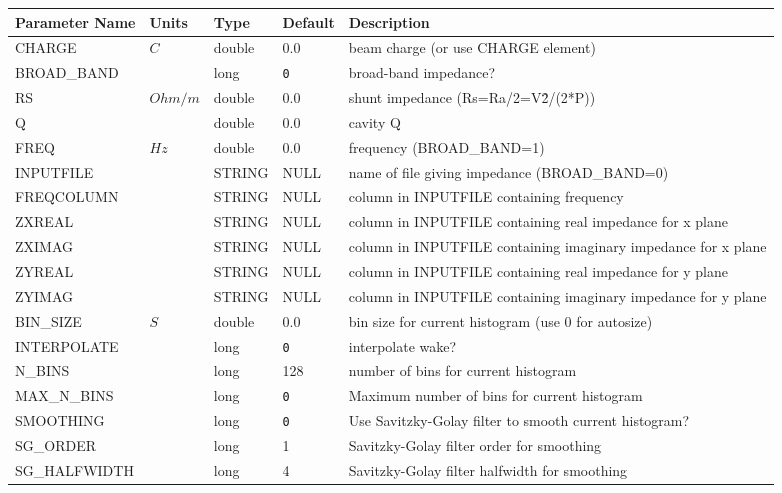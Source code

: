 \begin{tabular}{|l|l|l|l|p{\descwidth}|} \hline
Parameter Name & Units & Type & Default & Description \\ \hline 
CHARGE & $C$ & double &  0.0 & beam charge (or use CHARGE element)  \\ \hline 
BROAD\_BAND &  & long &  \verb|0| & broad-band impedance?  \\ \hline 
RS & $Ohm/m$ & double &  0.0 & shunt impedance (Rs=Ra/2=V\^2/(2*P))  \\ \hline 
Q &  & double &  0.0 & cavity Q  \\ \hline 
FREQ & $Hz$ & double &  0.0 & frequency (BROAD\_BAND=1)  \\ \hline 
INPUTFILE &  & STRING &   NULL            & name of file giving impedance (BROAD\_BAND=0)  \\ \hline 
FREQCOLUMN &  & STRING &   NULL            & column in INPUTFILE containing frequency  \\ \hline 
ZXREAL &  & STRING &   NULL            & column in INPUTFILE containing real impedance for x plane  \\ \hline 
ZXIMAG &  & STRING &   NULL            & column in INPUTFILE containing imaginary impedance for x plane  \\ \hline 
ZYREAL &  & STRING &   NULL            & column in INPUTFILE containing real impedance for y plane  \\ \hline 
ZYIMAG &  & STRING &   NULL            & column in INPUTFILE containing imaginary impedance for y plane  \\ \hline 
BIN\_SIZE & $S$ & double &  0.0 & bin size for current histogram (use 0 for autosize)  \\ \hline 
INTERPOLATE &  & long &  \verb|0| & interpolate wake?  \\ \hline 
N\_BINS &  & long &   128             & number of bins for current histogram  \\ \hline 
MAX\_N\_BINS &  & long &  \verb|0| & Maximum number of bins for current histogram  \\ \hline 
SMOOTHING &  & long &  \verb|0| & Use Savitzky-Golay filter to smooth current histogram?  \\ \hline 
SG\_ORDER &  & long &   1               & Savitzky-Golay filter order for smoothing  \\ \hline 
SG\_HALFWIDTH &  & long &   4               & Savitzky-Golay filter halfwidth for smoothing  \\ \hline 
\end{tabular}

